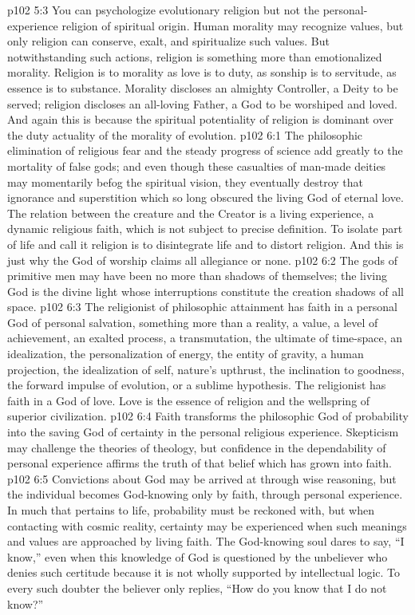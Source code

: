 \vs p102 5:3 You can psychologize evolutionary religion but not the personal\hyp{}experience religion of spiritual origin. Human morality may recognize values, but only religion can conserve, exalt, and spiritualize such values. But notwithstanding such actions, religion is something more than emotionalized morality. Religion is to morality as love is to duty, as sonship is to servitude, as essence is to substance. Morality discloses an almighty Controller, a Deity to be served; religion discloses an all\hyp{}loving Father, a God to be worshiped and loved. And again this is because the spiritual potentiality of religion is dominant over the duty actuality of the morality of evolution.
\vs p102 6:1 The philosophic elimination of religious fear and the steady progress of science add greatly to the mortality of false gods; and even though these casualties of man\hyp{}made deities may momentarily befog the spiritual vision, they eventually destroy that ignorance and superstition which so long obscured the living God of eternal love. The relation between the creature and the Creator is a living experience, a dynamic religious faith, which is not subject to precise definition. To isolate part of life and call it religion is to disintegrate life and to distort religion. And this is just why the God of worship claims all allegiance or none.
\vs p102 6:2 The gods of primitive men may have been no more than shadows of themselves; the living God is the divine light whose interruptions constitute the creation shadows of all space.
\pc \vs p102 6:3 The religionist of philosophic attainment has faith in a personal God of personal salvation, something more than a reality, a value, a level of achievement, an exalted process, a transmutation, the ultimate of time\hyp{}space, an idealization, the personalization of energy, the entity of gravity, a human projection, the idealization of self, nature’s upthrust, the inclination to goodness, the forward impulse of evolution, or a sublime hypothesis. The religionist has faith in a God of love. Love is the essence of religion and the wellspring of superior civilization.
\vs p102 6:4 Faith transforms the philosophic God of probability into the saving God of certainty in the personal religious experience. Skepticism may challenge the theories of theology, but confidence in the dependability of personal experience affirms the truth of that belief which has grown into faith.
\vs p102 6:5 Convictions about God may be arrived at through wise reasoning, but the individual becomes God\hyp{}knowing only by faith, through personal experience. In much that pertains to life, probability must be reckoned with, but when contacting with cosmic reality, certainty may be experienced when such meanings and values are approached by living faith. The God\hyp{}knowing soul dares to say, “I know,” even when this knowledge of God is questioned by the unbeliever who denies such certitude because it is not wholly supported by intellectual logic. To every such doubter the believer only replies, “How do you know that I do not know?”
